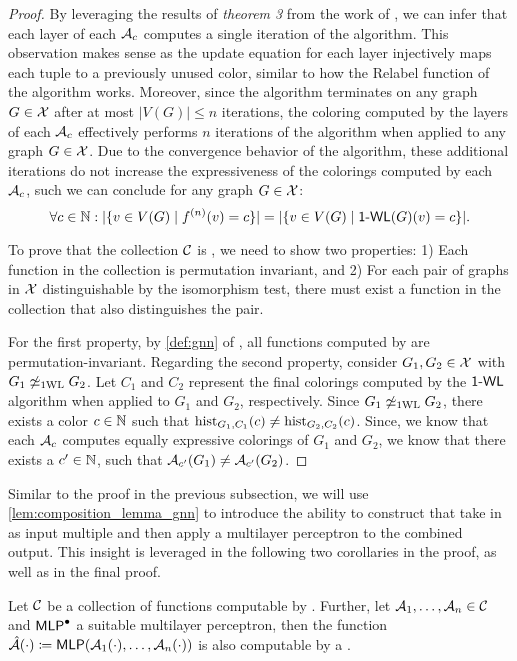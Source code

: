 \begin{proof}
    By leveraging the results of \textit{theorem 3} from the work of \cite{Xu2018}, we can infer that each layer of each $\mathcal{A}_c$ computes a single iteration of the \wl algorithm. This observation makes sense as the update equation for each layer injectively maps each tuple to a previously unused color, similar to how the \textsf{Relabel} function of the \wl algorithm works. Moreover, since the \wl algorithm terminates on any graph $G \in \mathcal{X}$ after at most $|V(G)| \leq n$ iterations, the coloring computed by the layers of each $\mathcal{A}_c$ effectively performs $n$ iterations of the \wl algorithm when applied to any graph $G \in \mathcal{X}$. Due to the convergence behavior of the \wl algorithm, these additional iterations do not increase the expressiveness of the colorings computed by each $\mathcal{A}_c$, such we can conclude for any graph $G \in \mathcal{X}$:
    \begin{equation*}
       \forall c \in \mathbb{N}: |\{ v \in V(G) \mid  f^{(n)}(v) = c \}| = |\{ v \in V(G) \mid  \textsf{1-WL}(G)(v) = c \}|.
    \end{equation*}

    To prove that the collection $\mathcal{C}$ is \wldisc, we need to show two properties: 1) Each function in the collection is permutation invariant, and 2) For each pair of graphs in $\mathcal{X}$ distinguishable by the \wl isomorphism test, there must exist a function in the collection that also distinguishes the pair.
   
    For the first property, by \cref{def:gnn} of \gnns, all functions computed by \gnns are permutation-invariant.
    Regarding the second property, consider $G_1, G_2 \in \mathcal{X}$ with $G_1 \not\simeq_{\text{1WL}} G_2$. Let $C_1$ and $C_2$ represent the final colorings computed by the $\textsf{1-WL}$ algorithm when applied to $G_1$ and $G_2$, respectively. Since $G_1 \not\simeq_{\text{1WL}} G_2$, there exists a color $c \in \mathbb{N}$ such that $\operatorname{hist}_{G_1,C_1}(c) \neq \operatorname{hist}_{G_2,C_2}(c)$. Since, we know that each $\mathcal{A}_c$ computes equally expressive colorings of $G_1$ and $G_2$, we know that there exists a $c' \in \mathbb{N}$, such that $\mathcal{A}_{c'}(G_1) \neq \mathcal{A}_{c'}(G_2)$.
\end{proof}
 
Similar to the proof in the previous subsection, we will use \cref{lem:composition_lemma_gnn} to introduce the ability to construct \gnns that take in as input multiple \gnns and then apply a multilayer perceptron to the combined output. This insight is leveraged in the following two corollaries in the proof, as well as in the final proof.

\begin{lemma}\label{lem:composition_lemma_gnn}
    Let $\mathcal{C}$ be a collection of functions computable by \gnns. Further, let  $\mathcal{A}_1, \dots , \mathcal{A}_n \in \mathcal{C}$ and $\textsf{MLP}^\bullet$ a suitable multilayer perceptron, then the function $\hat{\mathcal{A}}(\cdot) \coloneqq \textsf{MLP}(\mathcal{A}_1(\cdot), \dots, \mathcal{A}_n(\cdot))$ is also computable by a \gnn.
\end{lemma}

